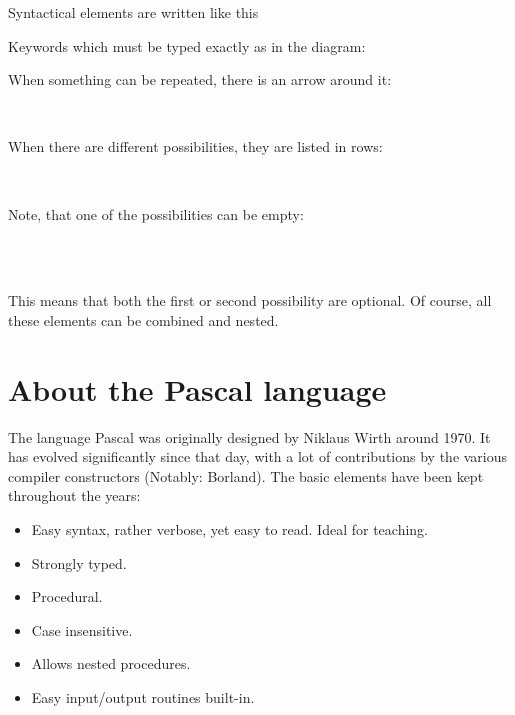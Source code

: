 Syntactical elements are written like this
\begin{mysyntdiag}
\end{mysyntdiag}
Keywords which must be typed exactly as in the diagram:
\begin{mysyntdiag}
\end{mysyntdiag}
When something can be repeated, there is an arrow around it:
\begin{mysyntdiag}
\begin{rep}[b]  \\ \end{rep}
\end{mysyntdiag}
When there are different possibilities, they are listed in rows:
\begin{mysyntdiag}
\begin{stack}
 \\
\end{stack}
\end{mysyntdiag}
Note, that one of the possibilities can be empty:
\begin{mysyntdiag}
\begin{stack}\\
 \\
\end{stack}
\end{mysyntdiag}
This means that both the first or second possibility are optional.
Of course, all these elements can be combined and nested.

\section*{About the Pascal language}
The language Pascal was originally designed by Niklaus Wirth around 1970. 
It has evolved significantly since that day, with a lot of contributions 
by the various compiler constructors (Notably: Borland). The basic elements 
have been kept throughout the years:
\begin{itemize}
\item Easy syntax, rather verbose, yet easy to read. Ideal for teaching.
\item Strongly typed.
\item Procedural.
\item Case insensitive.
\item Allows nested procedures.
\item Easy input/output routines built-in.
\end{itemize}

